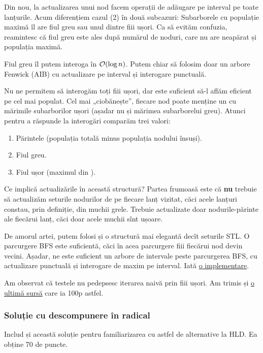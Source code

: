 \documentclass[../main.tex]{subfiles}
\begin{document}
Din nou, la actualizarea unui nod facem operații de adăugare pe interval pe toate lanțurile. Acum diferențiem cazul (2) în două subcazuri: Subarborele cu populație maximă îl are fiul greu sau unul dintre fiii ușori. Ca să evităm confuzia, reamintesc că fiul greu este ales după numărul de noduri, care nu are neapărat și populația maximă.

Fiul greu îl putem interoga în $\mathcal{O}(\log n)$. Putem chiar să folosim doar un arbore Fenwick (AIB) cu actualizare pe interval și interogare punctuală.

Nu ne permitem să interogăm toți fiii ușori, dar este suficient să-l aflăm eficient pe cel mai populat. Cel mai „ciobănește”, fiecare nod poate menține un  cu mărimile subarborilor ușori (așadar nu și mărimea subarborelui greu). Atunci pentru a răspunde la interogări comparăm trei valori:

\begin{enumerate}
  \item Părintele (populația totală minus populația nodului însuși).
  \item Fiul greu.
  \item Fiul ușor (maximul din ).
\end{enumerate}

Ce implică actualizările în această structură? Partea frumoasă este că \textbf{nu} trebuie să actualizăm seturile nodurilor de pe fiecare lanț vizitat, căci acele lanțuri constau, prin definiție, din muchii grele. Trebuie actualizate doar nodurile-părinte ale fiecărui lanț, căci doar acele muchii sînt ușoare.

De amorul artei, putem folosi și o structură mai elegantă decît seturile STL. O parcurgere BFS este suficientă, căci în acea parcurgere fiii fiecărui nod devin vecini. Așadar, ne este suficient un arbore de intervale peste parcurgerea BFS, cu actualizare punctuală și interogare de maxim pe interval. Iată \href{https://kilonova.ro/submissions/515909}{o implementare}.

Am observat că testele nu pedepsesc iterarea naivă prin fiii ușori. Am trimis și \href{https://kilonova.ro/submissions/515914}{o ultimă sursă} care ia 100p astfel.

\subsubsection*{Soluție cu descompunere în radical}

Includ și această soluție pentru familiarizarea cu astfel de alternative la HLD. Ea obține 70 de puncte.
\end{document}
